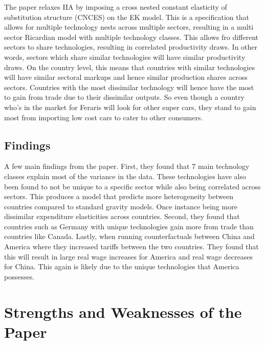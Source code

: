 \documentclass[10pt]{article}
\begin{document}
The paper relaxes IIA by imposing a cross nested constant elasticity of substitution structure (CNCES) on the EK model. This is a specification that allows for multiple technology nests across multiple sectors, resulting in a multi sector Ricardian model with multiple technology classes. This allows fro different sectors to share technologies, resulting in correlated productivity draws. In other words, sectors which share similar technologies will have similar productivity draws. On the country level, this means that countries with similar technologies will have similar sectoral markups and hence similar production shares across sectors. Countries with the most dissimilar technology will hence have the most to gain from trade due to their dissimilar outputs. So even though a country who’s in the market for Feraris will look for other super cars, they stand to gain most from importing low cost cars to cater to other consumers.

\subsection{Findings}

A few main findings from the paper. First, they found that 7 main technology classes explain most of the variance in the data. These technologies have also been found to not be unique to a specific sector while also being correlated across sectors. This produces a model that predicts more heterogeneity between countries compared to standard gravity models. Once instance being more dissimilar expenditure elasticities across countries. Second, they found that countries such as Germany with unique technologies gain more from trade than countries like Canada. Lastly, when running counterfactuals between China and America where they increased tariffs between the two countries. They found that this will result in large real wage increases for America and real wage decreases for China. This again is likely due to the unique technologies that America possesses.

\section{Strengths and Weaknesses of the Paper}
\end{document}
